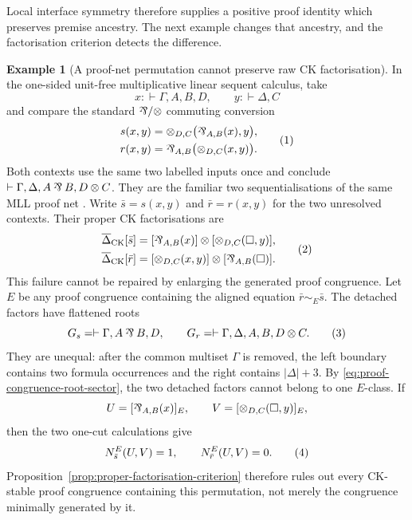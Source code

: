 \documentclass[10pt,a4paper]{article}
\theoremstyle{plain}
\theoremstyle{definition}
\newtheorem{example}[theorem]{Example}
\theoremstyle{remark}
\newcommand{\ms}{\mathrel{\vdash}}
\newcommand{\parr}{\mathbin{\rotatebox[origin=c]{180}{\&}}}
\newcommand{\eqtag}{\refstepcounter{equation}\tag{\theequation}}
\begin{document}
Local interface symmetry therefore supplies a positive proof identity which
preserves premise ancestry.  The next example changes that ancestry, and the
factorisation criterion detects the difference.

\begin{example}[A proof-net permutation cannot preserve raw CK factorisation]
\label{ex:mll-permutation-obstruction}
In the one-sided unit-free multiplicative linear sequent calculus, take
\[
 x:\ms\Gamma,A,B,D,\qquad y:\ms\Delta,C
\]
and compare the standard \(\parr/\otimes\) commuting conversion
\[
\begin{aligned}
 s(x,y)
   &=\otimes_{D,C}\bigl(\parr_{A,B}(x),y\bigr),\\
 r(x,y)
   &=\parr_{A,B}\bigl(\otimes_{D,C}(x,y)\bigr).
\end{aligned}
\eqtag\label{eq:mll-permutation-contexts}
\]
Both contexts use the same two labelled inputs once and conclude
\(
\ms\Gamma,\Delta,A\parr B,D\otimes C
\).
They are the familiar two sequentialisations of the same MLL proof net
\cite{girard1987}.  Write \(\bar s=s(x,y)\) and \(\bar r=r(x,y)\) for
the two unresolved contexts.  Their proper CK factorisations are
\[
\begin{aligned}
 \overline\Delta_{\mathrm{CK}}[\bar s]
   &=[\parr_{A,B}(x)]\otimes
       [\otimes_{D,C}(\Box,y)],\\
 \overline\Delta_{\mathrm{CK}}[\bar r]
   &=[\otimes_{D,C}(x,y)]\otimes
       [\parr_{A,B}(\Box)].
\end{aligned}
\eqtag\label{eq:mll-permutation-coproducts}
\]
This failure cannot be repaired by enlarging the generated proof
congruence.  Let \(E\) be any proof congruence containing the aligned
equation \(\bar r\sim_E\bar s\).  The detached factors have flattened
roots
\[
 G_s=\ms\Gamma,A\parr B,D,
 \qquad
 G_r=\ms\Gamma,\Delta,A,B,D\otimes C.
\eqtag\label{eq:mll-detached-root-obstruction}
\]
They are unequal: after the common multiset \(\Gamma\) is removed, the
left boundary contains two formula occurrences and the right contains
\(|\Delta|+3\).  By
\eqref{eq:proof-congruence-root-sector}, the two detached factors cannot
belong to one \(E\)-class.  If
\[
 U=[\parr_{A,B}(x)]_E,
 \qquad
 V=[\otimes_{D,C}(\Box,y)]_E,
\]
then the two one-cut calculations give
\[
            N_{\bar s}^{E}(U,V)=1,
            \qquad
            N_{\bar r}^{E}(U,V)=0.
\eqtag\label{eq:mll-absolute-factor-obstruction}
\]
Proposition~\ref{prop:proper-factorisation-criterion} therefore rules out
every CK-stable proof congruence containing this permutation, not merely
the congruence minimally generated by it.
\end{example}
\end{document}
